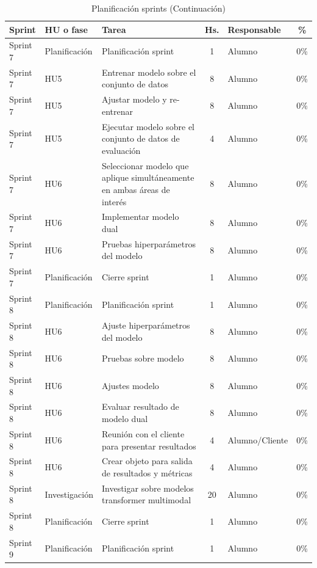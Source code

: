 \documentclass[
11pt, %
]{charter}
\begin{document}
\begin{table}[htpb]
\centering
\caption{Planificación sprints (Continuación)}
\begin{tabularx}{\linewidth}{@{}|l|l|X|c|l|c|@{}}
\hline
\rowcolor[HTML]{C0C0C0}
Sprint	&	HU o fase	&	Tarea	&	Hs.	&	Responsable	&	\%	\\ \hline

Sprint 7	&	Planificación	&	Planificación sprint	&	1	&	Alumno	&	0\%	\\ \hline
Sprint 7	&	HU5	&	Entrenar modelo sobre el conjunto de datos	&	8	&	Alumno	&	0\%	\\ \hline
Sprint 7	&	HU5	&	Ajustar modelo y re-entrenar	&	8	&	Alumno	&	0\%	\\ \hline
Sprint 7	&	HU5	&	Ejecutar modelo sobre el conjunto de datos de evaluación	&	4	&	Alumno	&	0\%	\\ \hline
Sprint 7	&	HU6	&	Seleccionar modelo que aplique simultáneamente en ambas áreas de interés	&	8	&	Alumno	&	0\%	\\ \hline
Sprint 7	&	HU6	&	Implementar modelo dual 	&	8	&	Alumno	&	0\%	\\ \hline
Sprint 7	&	HU6	&	Pruebas hiperparámetros del modelo	&	8	&	Alumno	&	0\%	\\ \hline
Sprint 7	&	Planificación	&	Cierre sprint	&	1	&	Alumno	&	0\%	\\ \hline
Sprint 8	&	Planificación	&	Planificación sprint	&	1	&	Alumno	&	0\%	\\ \hline
Sprint 8	&	HU6	&	Ajuste hiperparámetros del modelo	&	8	&	Alumno	&	0\%	\\ \hline
Sprint 8	&	HU6	&	Pruebas sobre modelo	&	8	&	Alumno	&	0\%	\\ \hline
Sprint 8	&	HU6	&	Ajustes modelo	&	8	&	Alumno	&	0\%	\\ \hline
Sprint 8	&	HU6	&	Evaluar resultado de modelo dual	&	8	&	Alumno	&	0\%	\\ \hline
Sprint 8	&	HU6	&	Reunión con el cliente para presentar resultados	&	4	&	Alumno/Cliente	&	0\%	\\ \hline
Sprint 8	&	HU6	&	Crear objeto para salida de resultados y métricas	&	4	&	Alumno	&	0\%	\\ \hline
Sprint 8	&	Investigación	&	Investigar sobre modelos  transformer multimodal	&	20	&	Alumno	&	0\%	\\ \hline
Sprint 8	&	Planificación	&	Cierre sprint	&	1	&	Alumno	&	0\%	\\ \hline
Sprint 9	&	Planificación	&	Planificación sprint	&	1	&	Alumno	&	0\%	\\ \hline

\end{tabularx}
\end{table}
\end{document}
